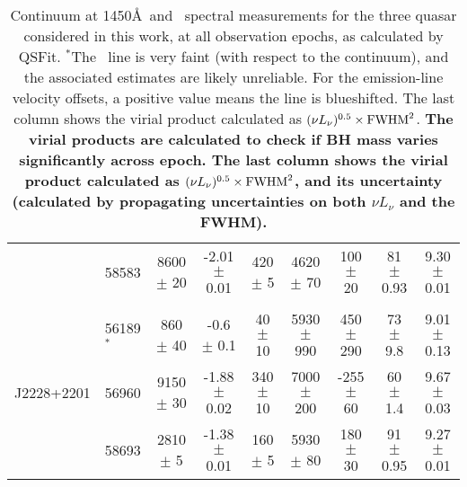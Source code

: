 \begin{table*}
\begin{centering}
\begin{tabular}{l  l | c c | c c c c | c}
                       &  58583        &    8600    $\pm$   20      &  -2.01 $\pm$ 0.01                             & 420    $\pm$  5        &  4620 $\pm$   70        &     100    $\pm$   20      &   81 $\pm$  0.93  &  9.30 $\pm$ 0.01\\
                       &                    &                                         &                                                          &                                   &                                   &                                        &                                    &                  \\
                       &  56189$^*$ &     860    $\pm$   40     &  -0.6  $\pm$ 0.1                                  &  40    $\pm$  10       &  5930 $\pm$  990      &     450    $\pm$  290      &   73  $\pm$  9.8   &  9.01  $\pm$ 0.13 \\
 J2228+2201  &  56960        &    9150    $\pm$   30     &  -1.88 $\pm$ 0.02                               &  340    $\pm$  10     &  7000 $\pm$  200     &    -255    $\pm$   60      &   60  $\pm$  1.4   &  9.67 $\pm$ 0.03\\
                      &  58693        &    2810  $\pm$    5        &  -1.38 $\pm$ 0.01                               &  160    $\pm$   5      &  5930 $\pm$   80       &     180    $\pm$   30      &   91 $\pm$  0.95  &  9.27 $\pm$ 0.01\\
      \hline
      \hline
      \hline
    \end{tabular}
    \caption{Continuum at 1450\AA\ and \civ\ spectral measurements for the
      three quasar considered in this work, at all observation epochs, as
      calculated by QSFit. $^{*}$The \civ\ line is very faint (with respect
      to the continuum), and the associated estimates are likely unreliable.
      For the emission-line velocity offsets, a positive value means the line is blueshifted. 
      The last column shows the virial product calculated as $(\nu
      L_{\nu})^{0.5} \times {\rm FWHM}^2$.
      {\bf      The virial products are calculated to check if BH mass varies significantly
        across epoch.
        The last column shows the virial product calculated as $(\nu L_{\nu})^{0.5} \times {\rm FWHM}^2$, and its uncertainty (calculated by propagating uncertainties on both $\nu L_{\nu}$ and the FWHM). 
      }
}
    \label{tab:QSFit-results}
  \end{centering}
\end{table*}